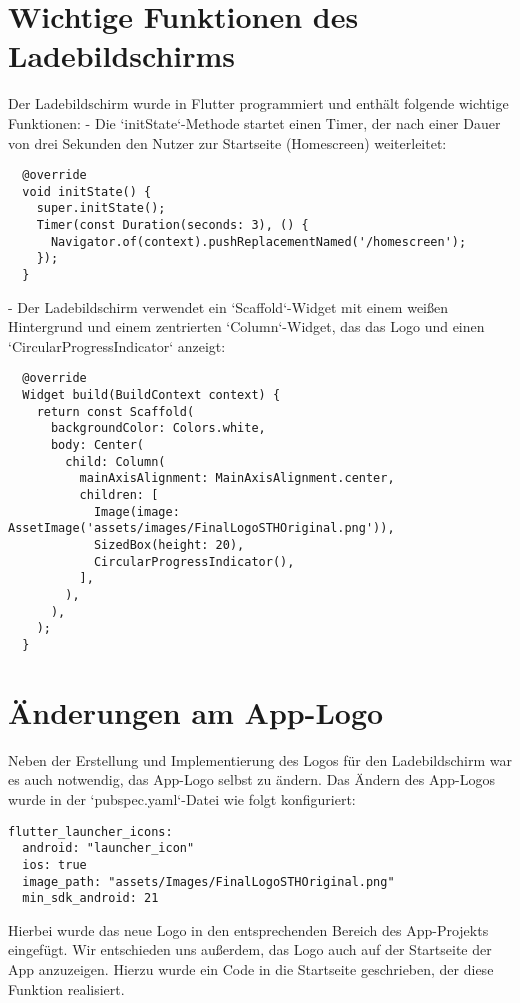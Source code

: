 \section*{Wichtige Funktionen des Ladebildschirms}
Der Ladebildschirm wurde in Flutter programmiert und enthält folgende wichtige Funktionen:\newline
- Die `initState`-Methode startet einen Timer, der nach einer Dauer von drei Sekunden den Nutzer zur Startseite (Homescreen) weiterleitet:
\begin{verbatim}
  @override
  void initState() {
    super.initState();
    Timer(const Duration(seconds: 3), () {
      Navigator.of(context).pushReplacementNamed('/homescreen');
    });
  }
\end{verbatim}
- Der Ladebildschirm verwendet ein `Scaffold`-Widget mit einem weißen Hintergrund und einem zentrierten `Column`-Widget, das das Logo und einen `CircularProgressIndicator` anzeigt:
\begin{verbatim}
  @override
  Widget build(BuildContext context) {
    return const Scaffold(
      backgroundColor: Colors.white,
      body: Center(
        child: Column(
          mainAxisAlignment: MainAxisAlignment.center,
          children: [
            Image(image: AssetImage('assets/images/FinalLogoSTHOriginal.png')),
            SizedBox(height: 20),
            CircularProgressIndicator(),
          ],
        ),
      ),
    );
  }
\end{verbatim}

\section*{Änderungen am App-Logo}
Neben der Erstellung und Implementierung des Logos für den Ladebildschirm war es auch notwendig, das App-Logo selbst zu ändern. Das Ändern des App-Logos wurde in der `pubspec.yaml`-Datei wie folgt konfiguriert:
\begin{verbatim}
flutter_launcher_icons:
  android: "launcher_icon"
  ios: true
  image_path: "assets/Images/FinalLogoSTHOriginal.png"
  min_sdk_android: 21
\end{verbatim}
Hierbei wurde das neue Logo in den entsprechenden Bereich des App-Projekts eingefügt. \newline
Wir entschieden uns außerdem, das Logo auch auf der Startseite der App anzuzeigen. Hierzu wurde ein Code in die Startseite geschrieben, der diese Funktion realisiert.
